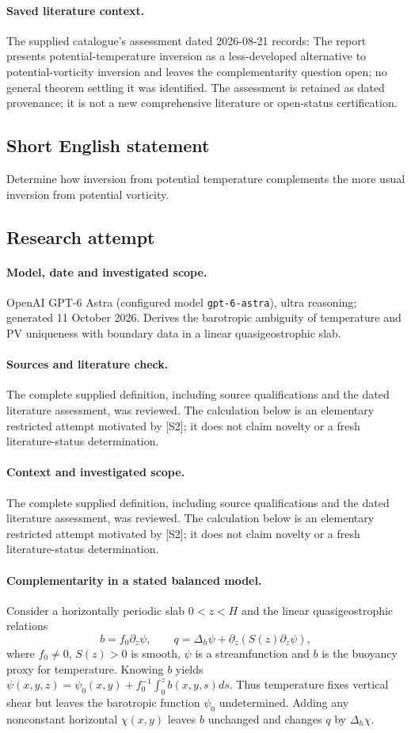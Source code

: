 \documentclass[11pt]{article}
\begin{document}
\paragraph{Saved literature context.} The supplied catalogue's assessment dated 2026-08-21 records: The report presents potential-temperature inversion as a less-developed alternative to potential-vorticity inversion and leaves the complementarity question open; no general theorem settling it was identified. The assessment is retained as dated provenance; it is not a new comprehensive literature or open-status certification.
\subsection{Short English statement}
Determine how inversion from potential temperature complements the more usual inversion from potential vorticity.
\subsection{Research attempt}
\paragraph{Model, date and investigated scope.}
OpenAI GPT-6 Astra (configured model \texttt{gpt-6-astra}), ultra reasoning; generated 11 October 2026. Derives the barotropic ambiguity of temperature and PV uniqueness with boundary data in a linear quasigeostrophic slab.

\paragraph{Sources and literature check.}
The complete supplied definition, including source qualifications and the dated literature assessment, was reviewed. The calculation below is an elementary restricted attempt motivated by [S2]; it does not claim novelty or a fresh literature-status determination.

\paragraph{Context and investigated scope.} The complete supplied definition, including source qualifications and the dated literature assessment, was reviewed. The calculation below is an elementary restricted attempt motivated by [S2]; it does not claim novelty or a fresh literature-status determination.

\paragraph{Complementarity in a stated balanced model.} Consider a horizontally periodic slab $0<z<H$ and the linear quasigeostrophic relations
\[
 b=f_0\partial_z\psi,\qquad q=\Delta_h\psi+\partial_z(S(z)\partial_z\psi),
\]
where $f_0\ne0$, $S(z)>0$ is smooth, $\psi$ is a streamfunction and $b$ is the buoyancy proxy for temperature. Knowing $b$ yields $\psi(x,y,z)=\psi_0(x,y)+f_0^{-1}\int_0^z b(x,y,s)ds$. Thus temperature fixes vertical shear but leaves the barotropic function $\psi_0$ undetermined. Adding any nonconstant horizontal $\chi(x,y)$ leaves $b$ unchanged and changes $q$ by $\Delta_h\chi$.
\end{document}
